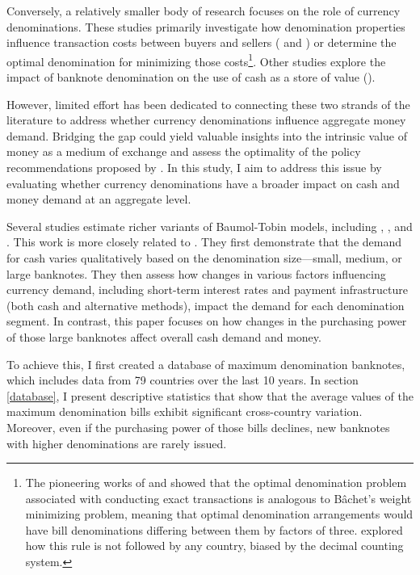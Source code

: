 \documentclass[12pt]{article}
\begin{document}
Conversely, a relatively smaller body of research focuses on the role of currency denominations. These studies primarily investigate how denomination properties influence transaction costs between buyers and sellers (\cite{cash_chen_2019} and \cite{currency_shy_2020}) or determine the optimal denomination for minimizing those costs\footnote{The pioneering works of \cite{Sumner1993} and \cite{TELSER1995} showed that the optimal denomination problem associated with conducting exact transactions is analogous to Bâchet's weight minimizing problem, meaning that optimal denomination arrangements would have bill denominations differing between them by factors of three. \cite{TschoeglAdrianE1997Todo} explored how this rule is not followed by any country, biased by the decimal counting system.}. Other studies explore the impact of banknote denomination on the use of cash as a store of value (\cite{cash_shy_2023}).

However, limited effort has been dedicated to connecting these two strands of the literature to address whether currency denominations influence aggregate money demand. Bridging the gap could yield valuable insights into the intrinsic value of money as a medium of exchange and assess the optimality of the policy recommendations proposed by \cite{rogoff2016}. In this study, I aim to address this issue by evaluating whether currency denominations have a broader impact on cash and money demand at an aggregate level.

Several studies estimate richer variants of Baumol-Tobin models, including \cite{Attanasio2002}, \cite{financial_alvarez_2009}, and \cite{ALVAREZ2019206}. This work is more closely related to \cite{Amromin2009}. They first demonstrate that the demand for cash varies qualitatively based on the denomination size—small, medium, or large banknotes. They then assess how changes in various factors influencing currency demand, including short-term interest rates and payment infrastructure (both cash and alternative methods), impact the demand for each denomination segment. In contrast, this paper focuses on how changes in the purchasing power of those large banknotes affect overall cash demand and money.

To achieve this, I first created a database of maximum denomination banknotes, which includes data from 79 countries over the last 10 years. In section \ref{database}, I present descriptive statistics that show that the average values of the maximum denomination bills exhibit significant cross-country variation. Moreover, even if the purchasing power of those bills declines, new banknotes with higher denominations are rarely issued.
\end{document}

